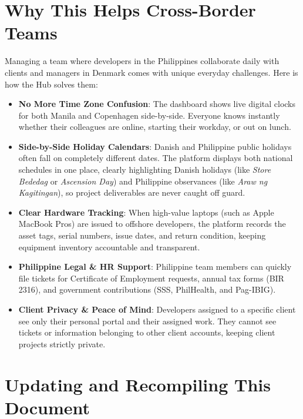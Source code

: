 \documentclass[a4paper,11pt]{article}
\begin{document}
\section{Why This Helps Cross-Border Teams}

Managing a team where developers in the Philippines collaborate daily with clients and managers in Denmark comes with unique everyday challenges. Here is how the Hub solves them:

\begin{itemize}
    \item \textbf{No More Time Zone Confusion}:
    The dashboard shows live digital clocks for both Manila and Copenhagen side-by-side. Everyone knows instantly whether their colleagues are online, starting their workday, or out on lunch.

    \item \textbf{Side-by-Side Holiday Calendars}:
    Danish and Philippine public holidays often fall on completely different dates. The platform displays both national schedules in one place, clearly highlighting Danish holidays (like \textit{Store Bededag} or \textit{Ascension Day}) and Philippine observances (like \textit{Araw ng Kagitingan}), so project deliverables are never caught off guard.

    \item \textbf{Clear Hardware Tracking}:
    When high-value laptops (such as Apple MacBook Pros) are issued to offshore developers, the platform records the asset tags, serial numbers, issue dates, and return condition, keeping equipment inventory accountable and transparent.

    \item \textbf{Philippine Legal \& HR Support}:
    Philippine team members can quickly file tickets for Certificate of Employment requests, annual tax forms (BIR 2316), and government contributions (SSS, PhilHealth, and Pag-IBIG).

    \item \textbf{Client Privacy \& Peace of Mind}:
    Developers assigned to a specific client see only their personal portal and their assigned work. They cannot see tickets or information belonging to other client accounts, keeping client projects strictly private.
\end{itemize}

\section{Updating and Recompiling This Document}
\end{document}
